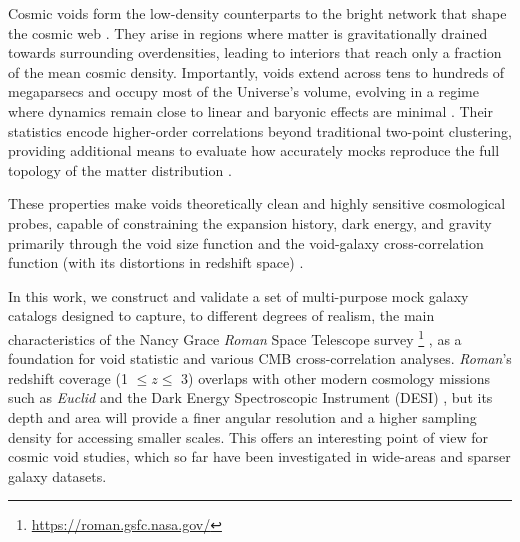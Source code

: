 \documentclass[]{aa} %
\begin{document}
Cosmic voids form the low-density counterparts to the bright network that shape the cosmic web \citep{joever&einasto1978,gregory&thompson1978,pisani2019review, moresco2022review}. They arise in regions where matter is gravitationally drained towards surrounding overdensities, leading to interiors that reach only a fraction of the mean cosmic density. Importantly, voids extend across tens to hundreds of megaparsecs and occupy most of the Universe’s volume, evolving in a regime where dynamics remain close to linear and baryonic effects are minimal \citep{lavaux&wandelt2012_stacking_vgcf_aprsd,hamaus2014_dens_and_vel,paillas2017}. Their statistics encode higher-order correlations beyond traditional two-point clustering, providing additional means to evaluate how accurately mocks reproduce the full topology of the matter distribution \citep[see e.g.,][]{Arsenov2025}.

These properties make voids theoretically clean and highly sensitive cosmological probes, capable of constraining the expansion history, dark energy, and gravity \citep{
biswas2010_probe_de,bos2012_probe_de,pisani2015_vsf,
pollina2016_probe_de,hawken2017_vgcf_rsd1,
contarini2019_vsf,architouv2019_vgcf_rsd,correa2019_new_probe,nadathur2020_vgcf_aprsd,
paillas2021_vgcf_aprsd,woodfinden2022_vgcf_aprsd,pelliciari2023_vsf,
contarini2023_vsf,mauland2023_vgcf_aprsd,song2024_vsf,fraser2025_vgcf_aprsd}  primarily through the void size function  \citep{sheth&vdweygaert2004_vsf, furlanetto2006_vsf, jennings2013_vsf, pisani2015_vsf, ronconi2017_vsf, correa2021_vsf, contarini2023_vsf, verza2024_vsf, elena2025_vsf} and the void-galaxy cross-correlation function (with its distortions in redshift space) \citep{kaiser1987, alcock_1979, lavaux&wandelt2012_stacking_vgcf_aprsd, sutter2012_vgcf_ap, pisani2014_vgcf, cai2016_vgcf_rsd, mao2017_vgcf_ap, nadathur2019_vgcf_aprsd, aubert2022_vgcf_rsd, correa2022_vgcf_aprsd, hamaus_2022_vgcf_aprsd, woodfinden2022_vgcf_aprsd, radinovic2023_vgcf_aprsd, verza2024_vgcf_and_vsf_aprsd, degni2025_vgcf_aprsd,schuster2025_dens}.

In this work, we construct and validate a set of multi-purpose mock galaxy catalogs designed to capture, to different degrees of realism, the main characteristics of the Nancy Grace \emph{Roman} Space Telescope survey \footnote{\url{https://roman.gsfc.nasa.gov/}} \citep{ROMAN2015_survey}, as a foundation for void statistic and various CMB cross-correlation analyses. \emph{Roman}'s redshift coverage (1 $\leq z \leq$ 3) overlaps with other modern cosmology missions such as \emph{Euclid} \citep{EUCLID2011_survey} and the Dark Energy Spectroscopic Instrument (DESI) \citep{DESI2016_survey}, but its depth and area will provide a finer angular resolution and a higher sampling density for accessing smaller scales. This offers an interesting point of view for cosmic void studies, which so far have been investigated in wide-areas and sparser galaxy datasets.
\end{document}
